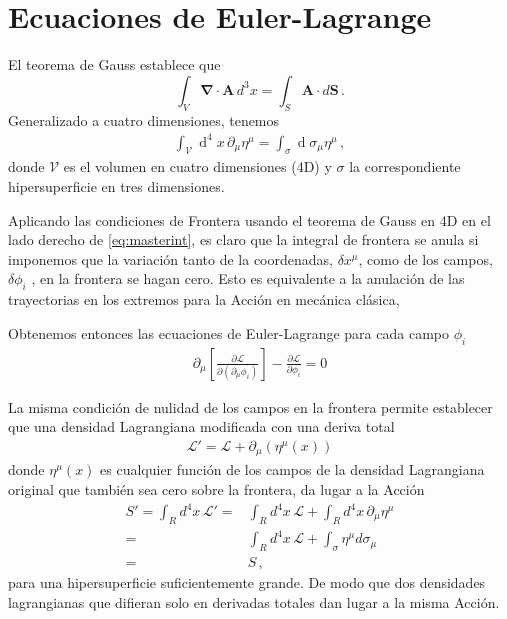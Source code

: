 \section{Ecuaciones de Euler-Lagrange}
El teorema de Gauss establece que
\begin{equation}
\int_V\boldsymbol{\nabla}\cdot\mathbf{A}\,d^3x=
 \int_S\mathbf{A}\cdot d\mathbf{S}\,.
\end{equation}
Generalizado a cuatro dimensiones, tenemos
\begin{align}
\int_{\mathcal{V}} \operatorname{d}^4x\,\partial_{\mu} \eta^{\mu}=
\int_{\sigma} \operatorname{d}\sigma_{\mu} \eta^{\mu}\,,   
\end{align}
donde $\mathcal{V}$ es el volumen en cuatro dimensiones (4D) y $\sigma$ la correspondiente hipersuperficie en tres dimensiones.

Aplicando las condiciones de Frontera usando  el teorema de Gauss en 4D en el lado derecho de \eqref{eq:masterint},
es claro que la integral de frontera se anula si imponemos que la variación tanto de la coordenadas, $\delta x^{\mu}$, como de los campos, $\delta \phi_{i}$ , en la frontera se hagan cero. Esto es equivalente a la anulación de las trayectorias en los extremos para la Acción en mecánica clásica, 

\begin{frame}
Obtenemos entonces las ecuaciones de Euler-Lagrange para cada campo $\phi_i$
\begin{align}
\label{eq:eelcallfmu}
  \partial_{\mu} \left[ \frac{\partial\mathcal{L}}{\partial(\partial_{\mu}\phi_i)}\right]-\frac{\partial\mathcal{L}}{\partial\phi_i}=0
\end{align}

La misma condición de nulidad de los campos en la frontera permite establecer que una densidad Lagrangiana modificada con una deriva total
\begin{align}
  \mathcal{L}'=\mathcal{L}+\partial_\mu(\eta^{\mu}(x))
\end{align}
donde $\eta^{\mu}(x)$ es cualquier función de los campos de la densidad Lagrangiana original que también sea cero sobre la frontera, da lugar a la Acci\'on
\begin{align}
  S'=\int_{R}d^4x\,\mathcal{L}'=&\int_{R}d^4x\,\mathcal{L}+\int_R d^4x\,\partial_\mu\eta^{\mu}\nonumber\\
  =&\int_{R}d^4x\,\mathcal{L}+\int_\sigma \eta^{\mu} d\sigma_{\mu}\nonumber\\
  =&S\,,
\end{align}
para una hipersuperficie suficientemente grande. De modo que dos densidades lagrangianas que difieran solo en derivadas totales dan lugar a la misma Acci\'on.
\end{frame}

